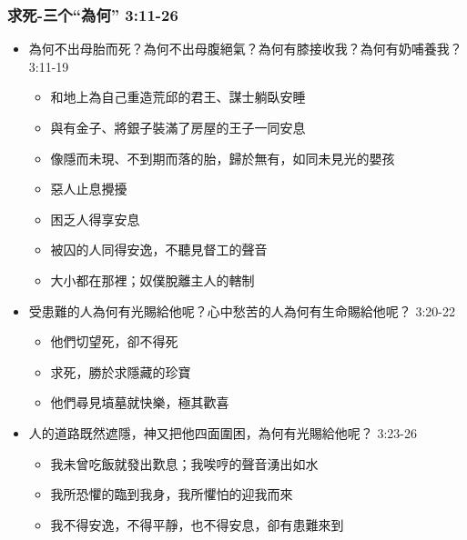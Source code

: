 \subsubsection{求死-三个“為何”  3:11-26}
\begin{itemize}
\itemsep-.45em  
\item 為何不出母胎而死？為何不出母腹絕氣？為何有膝接收我？為何有奶哺養我？ 3:11-19
\begin{itemize}
\itemsep-.45em  
\item 和地上為自己重造荒邱的君王、謀士躺臥安睡
\item 與有金子、將銀子裝滿了房屋的王子一同安息
\item 像隱而未現、不到期而落的胎，歸於無有，如同未見光的嬰孩
\item 惡人止息攪擾
\item 困乏人得享安息
\item 被囚的人同得安逸，不聽見督工的聲音
\item 大小都在那裡；奴僕脫離主人的轄制
\end{itemize}
\item 受患難的人為何有光賜給他呢？心中愁苦的人為何有生命賜給他呢？ 3:20-22
\begin{itemize}
\itemsep-.45em  
\item 他們切望死，卻不得死
\item 求死，勝於求隱藏的珍寶
\item 他們尋見墳墓就快樂，極其歡喜
\end{itemize}
\item 人的道路既然遮隱，神又把他四面圍困，為何有光賜給他呢？ 3:23-26
\begin{itemize}
\itemsep-.45em  
\item 我未曾吃飯就發出歎息；我唉哼的聲音湧出如水
\item 我所恐懼的臨到我身，我所懼怕的迎我而來
\item 我不得安逸，不得平靜，也不得安息，卻有患難來到
\end{itemize}
\end{itemize}

